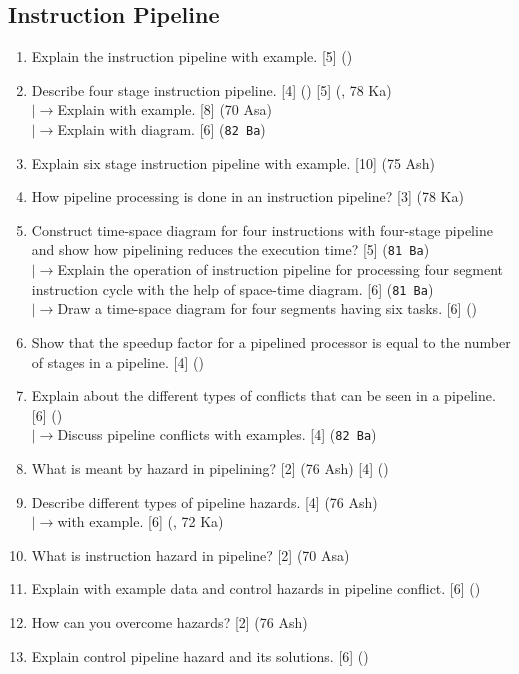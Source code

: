 \documentclass[12pt]{article}
\newcommand{\lb}{\\$\left|\rightarrow\right.$}
\begin{document}
	\subsection{Instruction Pipeline}
		\begin{enumerate}
			\item Explain the instruction pipeline with example. \hfill [5] ()

			\item Describe four stage instruction pipeline. \hfill [4] () [5] (, 78 Ka)
			\lb Explain with example. \hfill [8] (70 Asa)
			\lb Explain with diagram. \hfill [6] (\texttt{82 Ba})

			\item Explain six stage instruction pipeline with example. \hfill [10] (75 Ash)	
			
			\item How pipeline processing is done in an instruction pipeline? \hfill [3] (78 Ka)

			\item Construct time-space diagram for four instructions with four-stage pipeline and show how pipelining reduces the execution time? \hfill [5] (\texttt{81 Ba})
			\lb Explain the operation of instruction pipeline for processing four segment instruction cycle with the help of space-time diagram. \hfill [6] (\texttt{81 Ba})
			\lb Draw a time-space diagram for four segments having six tasks. \hfill [6] ()

			\item Show that the speedup factor for a pipelined processor is equal to the number of stages in a pipeline. \hfill [4] ()
			
			\item Explain about the different types of conflicts that can be seen in a pipeline. \hfill [6] ()
			\lb Discuss pipeline conflicts with examples. \hfill [4] (\texttt{82 Ba})

			\item What is meant by hazard in pipelining? \hfill [2] (76 Ash) [4] ()

			\item Describe different types of pipeline hazards. \hfill [4] (76 Ash)
			\lb with example. \hfill [6] (, 72 Ka)

			\item What is instruction hazard in pipeline? \hfill [2] (70 Asa)

			\item Explain with example data and control hazards in pipeline conflict. \hfill [6] ()

			\item How can you overcome hazards? \hfill [2] (76 Ash)

			\item Explain control pipeline hazard and its solutions. \hfill [6] ()
		\end{enumerate}
\end{document}
